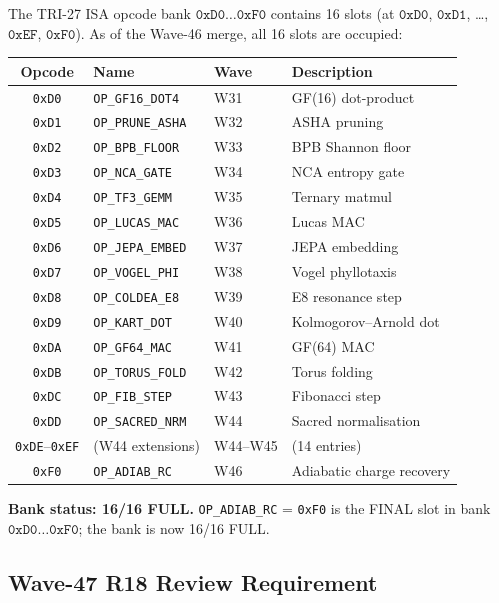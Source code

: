 The TRI-27 ISA opcode bank $\texttt{0xD0}\ldots\texttt{0xF0}$ contains 16 slots
(at $\texttt{0xD0}$, $\texttt{0xD1}$, \ldots, $\texttt{0xEF}$, $\texttt{0xF0}$).
As of the Wave-46 merge, all 16 slots are occupied:

\begin{center}
\begin{tabular}{clll}
\hline
Opcode & Name & Wave & Description \\
\hline
\texttt{0xD0} & \texttt{OP\_GF16\_DOT4} & W31 & GF(16) dot-product \\
\texttt{0xD1} & \texttt{OP\_PRUNE\_ASHA} & W32 & ASHA pruning \\
\texttt{0xD2} & \texttt{OP\_BPB\_FLOOR} & W33 & BPB Shannon floor \\
\texttt{0xD3} & \texttt{OP\_NCA\_GATE} & W34 & NCA entropy gate \\
\texttt{0xD4} & \texttt{OP\_TF3\_GEMM} & W35 & Ternary matmul \\
\texttt{0xD5} & \texttt{OP\_LUCAS\_MAC} & W36 & Lucas MAC \\
\texttt{0xD6} & \texttt{OP\_JEPA\_EMBED} & W37 & JEPA embedding \\
\texttt{0xD7} & \texttt{OP\_VOGEL\_PHI} & W38 & Vogel phyllotaxis \\
\texttt{0xD8} & \texttt{OP\_COLDEA\_E8} & W39 & E8 resonance step \\
\texttt{0xD9} & \texttt{OP\_KART\_DOT} & W40 & Kolmogorov--Arnold dot \\
\texttt{0xDA} & \texttt{OP\_GF64\_MAC} & W41 & GF(64) MAC \\
\texttt{0xDB} & \texttt{OP\_TORUS\_FOLD} & W42 & Torus folding \\
\texttt{0xDC} & \texttt{OP\_FIB\_STEP} & W43 & Fibonacci step \\
\texttt{0xDD} & \texttt{OP\_SACRED\_NRM} & W44 & Sacred normalisation \\
\texttt{0xDE}--\texttt{0xEF} & (W44 extensions) & W44--W45 & (14 entries) \\
\texttt{0xF0} & \texttt{OP\_ADIAB\_RC} & W46 & Adiabatic charge recovery \\
\hline
\end{tabular}
\end{center}

\textbf{Bank status: 16/16 FULL.}
\texttt{OP\_ADIAB\_RC} = \texttt{0xF0} is the FINAL slot in bank
$\texttt{0xD0}\ldots\texttt{0xF0}$; the bank is now 16/16 FULL.

\subsection{Wave-47 R18 Review Requirement}


